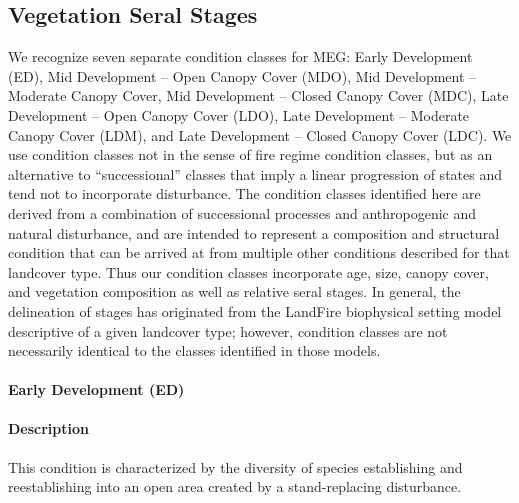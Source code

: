 \subsection*{Vegetation Seral Stages}
We recognize seven separate condition classes for MEG: Early Development (ED), Mid Development – Open Canopy Cover (MDO), Mid Development – Moderate Canopy Cover, Mid Development – Closed Canopy Cover (MDC), Late Development – Open Canopy Cover (LDO), Late Development – Moderate Canopy Cover (LDM), and Late Development – Closed Canopy Cover (LDC). We use condition classes not in the sense of fire regime condition classes, but as an alternative to ``successional'' classes that imply a linear progression of states and tend not to incorporate disturbance. The condition classes identified here are derived from a combination of successional processes and anthropogenic and natural disturbance, and are intended to represent a composition and structural condition that can be arrived at from multiple other conditions described for that landcover type. Thus our condition classes incorporate age, size, canopy cover, and vegetation composition as well as relative seral stages. In general, the delineation of stages has originated from the LandFire biophysical setting model descriptive of a given landcover type; however, condition classes are not necessarily identical to the classes identified in those models. 

\paragraph{Early Development (ED)}

\paragraph{Description} This condition is characterized by the diversity of species establishing and reestablishing into an open area created by a stand-replacing disturbance. 

